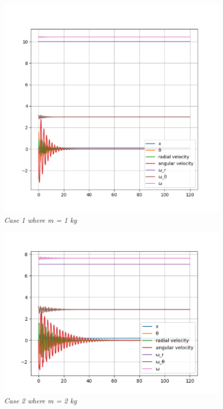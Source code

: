 \begin{figure}[H]
    \centering
    \includegraphics[width=15cm]{SimPictures/m1.png}
    \caption{\textit{Case 1 where m = 1 kg}}
    \label{}
\end{figure}
        
\begin{figure}[H]
    \centering
    \includegraphics[width=15cm]{SimPictures/m2.png}
    \caption{\textit{Case 2 where m = 2 kg}}
    \label{}
\end{figure}
        
